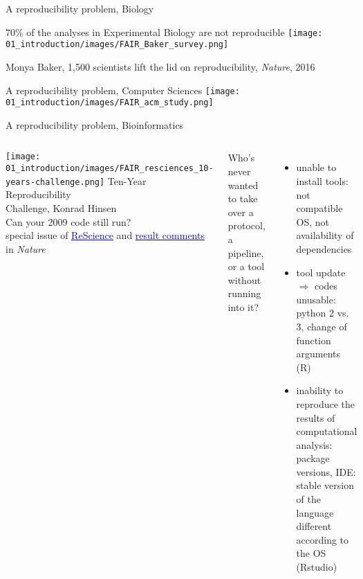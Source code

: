 \begin{frame}{A reproducibility problem, Biology}
\begin{center}
   \alert{$70\%$} of the analyses in Experimental Biology are \alert{not} reproducible
   \vfill
   \texttt{[image: 01\_introduction/images/FAIR\_Baker\_survey.png]}
\end{center}
\tiny{Monya Baker, 1,500 scientists lift the lid on reproducibility, \textit{Nature}, 2016}
\end{frame}
\begin{frame}{A reproducibility problem, Computer Sciences}
    \texttt{[image: 01\_introduction/images/FAIR\_acm\_study.png]}
\end{frame}
\begin{frame}{A reproducibility problem, Bioinformatics}
\begin{columns}
   \begin{center}
\texttt{[image: 01\_introduction/images/FAIR\_resciences\_10-years-challenge.png]}
\small{
Ten-Year Reproducibility\\
Challenge, Konrad Hinsen\\
Can your 2009 code still run? \\
special issue of \href{http://rescience.github.io/ten-years}{\textcolor{blue}{\underline{ReScience}}} and \href{https://www.nature.com/articles/d41586-020-02462-7}{\textcolor{blue}{result comments}} in \textit{Nature}
}
   \end{center}
Who's never wanted to take over a protocol, a pipeline, or a tool without running into it?
\begin{itemize}
    \item unable to install tools: not compatible OS, not availability of dependencies
    \item tool update $\Rightarrow$ codes unusable: python 2 vs. 3, change of function arguments (R)
    \item inability to reproduce the results of computational analysis: package versions, IDE: stable version of the language different according to the OS (Rstudio)
\end{itemize}
\end{columns}
\end{frame}
